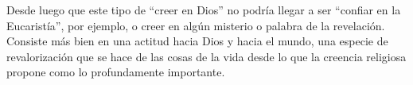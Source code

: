 Desde luego que este tipo de ``creer en Dios'' no podría llegar a ser ``confiar en la Eucaristía'', por ejemplo, o creer en algún misterio o palabra de la revelación. Consiste más bien en una actitud hacia Dios y hacia el mundo, una especie de revalorización que se hace de las cosas de la vida desde lo que la creencia religiosa propone como lo profundamente importante.
%
